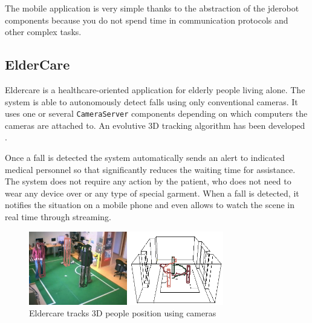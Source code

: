 \documentclass[twocolumn]{svjour3}          %
\begin{document}
The mobile application is very simple thanks to the abstraction of the
jderobot components because you do not spend time in communication
protocols and other complex tasks. 





\subsection{ElderCare}

Eldercare is a healthcare-oriented application for elderly people living alone. The system is able to autonomously detect falls using only conventional cameras. It uses one or several \texttt{CameraServer} components depending on which computers the cameras are attached to. An evolutive 3D tracking algorithm has been developed \cite{canas2011}.

Once a fall is detected the system automatically sends an alert to indicated medical personnel so that significantly reduces the waiting time for assistance. The system does not require any action by the patient, who does not need to wear any device over or any type of special garment. 
When a fall is detected, it notifies the situation on a mobile phone and even allows to watch the scene in real time through streaming.

\begin{figure}
\includegraphics[width=8.5cm]{figs/eldercare.png}
\caption{Eldercare tracks 3D people position using cameras}
\label{fig:eldercare}
\end{figure}
\end{document}
